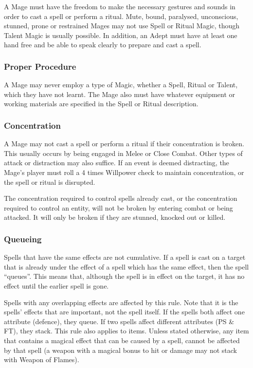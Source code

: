 \begin{multicols*}{3}
A Mage must have the freedom to make the necessary gestures and sounds
in order to cast a spell or perform a ritual. Mute, bound, paralysed,
unconscious, stunned, prone or restrained Mages may not use Spell or
Ritual Magic, though Talent Magic is usually possible.  In addition,
an Adept must have at least one hand free and be able to speak clearly
to prepare and cast a spell.

\subsubsection{Proper Procedure}

A Mage may never employ a type of Magic, whether a Spell, Ritual or
Talent, which they have not learnt. The Mage also must have whatever
equipment or working materials are specified in the Spell or Ritual
description.

\subsubsection{Concentration}
\label{magic:concentration}

A Mage may not cast a spell or perform a ritual if their concentration
is broken. This usually occurs by being engaged in Melee or Close
Combat. Other types of attack or distraction may also suffice. If an
event is deemed distracting, the Mage's player must roll a 4 times
Willpower check to maintain concentration, or the spell or ritual is
disrupted.

The concentration required to control spells already cast, or the
concentration required to control an entity, will not be broken by
entering combat or being attacked. It will only be broken if they are
stunned, knocked out or killed.

\subsubsection{Queueing}

Spells that have the same effects are not cumulative. If a spell is
cast on a target that is already under the effect of a spell which has
the same effect, then the spell ``queues''. This means that, although
the spell is in effect on the target, it has no effect until the
earlier spell is gone.

Spells with any overlapping effects are affected by this rule. Note
that it is the spells' effects that are important, not the spell
itself. If the spells both affect one attribute (\eg defence), they
queue. If two spells affect different attributes (\eg PS \& FT), they
stack. This rule also applies to items. Unless stated otherwise, any
item that contains a magical effect that can be caused by a spell,
cannot be affected by that spell (\eg a weapon with a magical bonus to
hit or damage may not stack with Weapon of Flames).


\end{multicols*}
